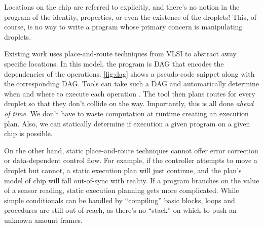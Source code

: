 \documentclass[
  10pt,
  a4paper,
  twocolumn,
]{article}
\begin{document}
Locations on the chip are referred to explicitly, and there's no notion in the program of the identity, properties, or even the existence of the droplets!
This, of course, is no way to write a program whose primary concern is manipulating droplets.

Existing work uses place-and-route techniques from VLSI to abstract away specific locations.
In this model, the program is DAG that encodes the dependencies of the operations.
\autoref{fig:dag} shows a pseudo-code snippet along with the corresponding DAG.
Tools can take such a DAG and automatically determine when and where to execute each operation \cite{grissom2015open}.
The tool then plans routes for every droplet so that they don't collide on the way.
Importantly, this is all done \emph{ahead of time}.
We don't have to waste computation at runtime creating an execution plan.
Also, we can statically determine if execution a given program on a given chip is possible.

On the other hand, static place-and-route techniques cannot offer error correction or data-dependent control flow.
For example, if the controller attempts to move a droplet but cannot, a static execution plan will just continue, and the plan's model of chip will fall out-of-sync with reality.
If a program branches on the value of a sensor reading, static execution planning gets more complicated.
While simple conditionals can be handled by ``compiling'' basic blocks, loops and procedures are still out of reach, as there's no ``stack'' on which to push an unknown amount frames.
\end{document}
